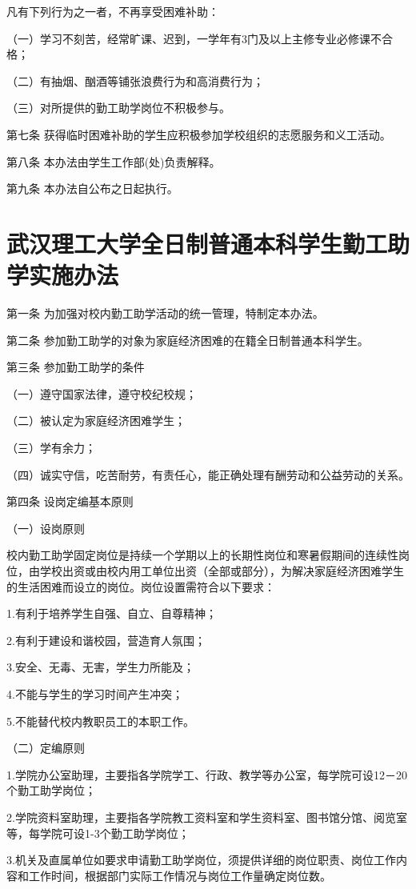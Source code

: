 \documentclass[UTF8,12pt,a4paper]{report}
\begin{document}
凡有下列行为之一者，不再享受困难补助：

（一）学习不刻苦，经常旷课、迟到，一学年有3门及以上主修专业必修课不合格；

（二）有抽烟、酗酒等铺张浪费行为和高消费行为；

（三）对所提供的勤工助学岗位不积极参与。

第七条 获得临时困难补助的学生应积极参加学校组织的志愿服务和义工活动。

第八条 本办法由学生工作部(处)负责解释。

第九条 本办法自公布之日起执行。

\chapter{武汉理工大学全日制普通本科学生勤工助学实施办法}
第一条 为加强对校内勤工助学活动的统一管理，特制定本办法。

第二条 参加勤工助学的对象为家庭经济困难的在籍全日制普通本科学生。

第三条 参加勤工助学的条件

（一）遵守国家法律，遵守校纪校规；

（二）被认定为家庭经济困难学生；

（三）学有余力；

（四）诚实守信，吃苦耐劳，有责任心，能正确处理有酬劳动和公益劳动的关系。

第四条 设岗定编基本原则

（一）设岗原则

校内勤工助学固定岗位是持续一个学期以上的长期性岗位和寒暑假期间的连续性岗位，由学校出资或由校内用工单位出资（全部或部分），为解决家庭经济困难学生的生活困难而设立的岗位。岗位设置需符合以下要求：

1.有利于培养学生自强、自立、自尊精神；

2.有利于建设和谐校园，营造育人氛围；

3.安全、无毒、无害，学生力所能及；

4.不能与学生的学习时间产生冲突；

5.不能替代校内教职员工的本职工作。

（二）定编原则

1.学院办公室助理，主要指各学院学工、行政、教学等办公室，每学院可设12－20个勤工助学岗位；

2.学院资料室助理，主要指各学院教工资料室和学生资料室、图书馆分馆、阅览室等，每学院可设1-3个勤工助学岗位；

3.机关及直属单位如要求申请勤工助学岗位，须提供详细的岗位职责、岗位工作内容和工作时间，根据部门实际工作情况与岗位工作量确定岗位数。
\end{document}
